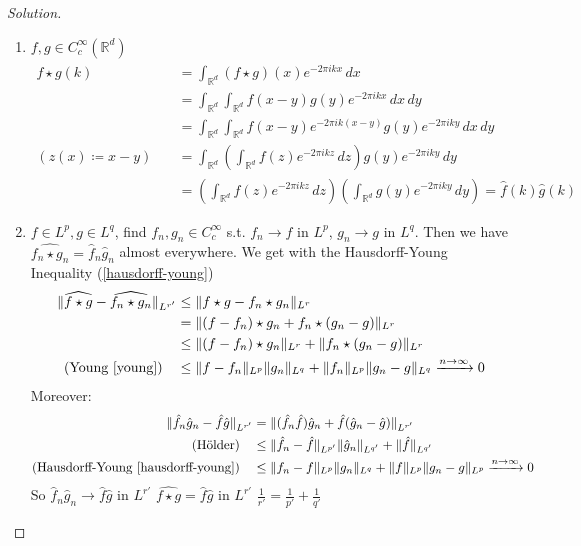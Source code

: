 \documentclass{report}
\theoremstyle{tommy}
\begin{document}
  \begin{proof}[Solution] \
    \begin{enumerate}[label=Step \arabic*)]
      \item \(f, g \in C_c^\infty(\mathbb{R}^d)\)
      \begin{align*}
        \widehat{f \star g}(k) &= \int_{\mathbb{R}^d} (f \star g)(x) e^{-2 \pi i k x} \, dx \\
        &= \int_{\mathbb{R}^d}\int_{\mathbb{R}^d} f(x-y) g(y) e^{-2 \pi i kx} \, dx \, dy \\
        &= \int_{\mathbb{R}^d}\int_{\mathbb{R}^d} f(x-y)e^{-2 \pi i k(x-y)} g(y) e^{-2 \pi i ky} \, dx \, dy \\
        (z(x) \coloneqq x-y) \quad &= \int_{\mathbb{R}^d}\left(\int_{\mathbb{R}^d} f(z) e^{- 2 \pi i kz} \, dz\right) g(y) e^{- 2 \pi i k y}  \, dy \\
        &= \left(\int_{\mathbb{R}^d} f(z) e^{- 2 \pi i kz} \, dz\right) \left(\int_{\mathbb{R}^d} g(y) e^{- 2 \pi i k y}  \, dy\right) = \hat f(k) \hat g(k)
      \end{align*}
      \item \(f \in L^p, g \in L^q\), find \(f_n, g_n \in C_c^\infty\) s.t. \(f_n \to f\) in \(L^p\), \(g_n \to g\) in \(L^q\). Then we have \(\widehat{f_n \star g_n} = \hat f_n \hat g_n\) almost everywhere. We get with the Hausdorff-Young Inequality (\ref{hausdorff-young})
      \begin{align*}
        \|\widehat{f \star g} - \widehat{f_n \star g_n}\|_{L^{r'}}
        &\le \|f \star g - f_n \star g_n\|_{L^r} \\
        &= \|(f - f_n) \star g_n + f_n \star (g_n - g) \|_{L^r} \\
        &\le \| (f-f_n) \star g_n \|_{L^r} + \| f_n \star (g_n - g)\|_{L^r} \\
        \text{(Young \ref{young})} \quad &\le \|f - f_n\|_{L^p} \|g_n\|_{L^q} + \|f_n\|_{L^p} \|g_n - g\|_{L^q} \xrightarrow{n \to \infty} 0
      \end{align*}
      Moreover:
      \begin{align*}
        \|\hat f_n \hat g_n - \hat f \hat g \|_{L^{r'}} 
        &= \|(\hat f_n \hat f)\hat g_n + \hat f (\hat g_n - \hat g) \|_{L^{r'}} \\
        \text{(Hölder)} \quad &\le \|\hat f_n - \hat f \|_{L^{p'}} \| \hat g_n \|_{L^{q'}} + \| \hat f \|_{L^{q'}} \\
        \text{(Hausdorff-Young \ref{hausdorff-young})} \quad &\le \| f_n - f \|_{L^p}\|g_n\|_{L^q} + \|f\|_{L^p} \|g_n - g\|_{L^p} \xrightarrow{n \to \infty} 0
      \end{align*}
      So \(\hat f_n \hat g_n \to \hat f \hat g \text{ in } L^{r'}\)
      \(\widehat{f \star g} = \hat f \hat g\) in \(L^{r'}\)
      \(\frac{1}{r'} = \frac{1}{p'} + \frac{1}{q'}\) \qedhere
    \end{enumerate}
  \end{proof}
  
\end{document}
